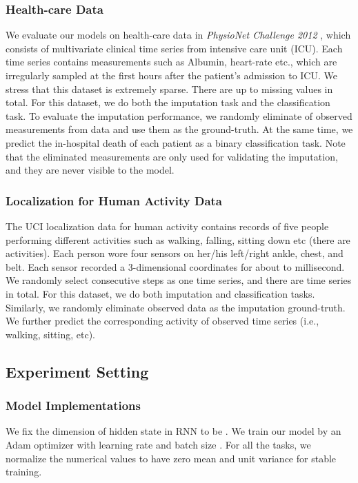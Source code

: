 \documentclass{article}
\begin{document}
\subsubsection{Health-care Data}
We evaluate our models on health-care data in {\em PhysioNet Challenge 2012} \cite{silva2012predicting}, which consists of  multivariate clinical time series from intensive care unit (ICU). Each time series contains  measurements such as Albumin, heart-rate etc., which are irregularly sampled at the first  hours after the patient's admission to ICU. We stress that this dataset is extremely sparse. There are up to  missing values in total.
For this dataset, we do both the imputation task and  the classification task. To evaluate the imputation performance, we randomly eliminate  of observed measurements from data and use them as the  ground-truth. At the same time, we predict the in-hospital death of each patient as a binary classification task. Note that the eliminated measurements are only used for validating the imputation, and they are never visible to the model.

\subsubsection{Localization for Human Activity Data}
The UCI localization data for human activity \cite{kaluvza2010agent} contains records of five people performing different activities such as  walking, falling, sitting down etc (there are  activities). Each person wore four sensors on her/his left/right ankle, chest, and belt. Each sensor recorded a 3-dimensional coordinates for about  to   millisecond. We randomly select  consecutive steps as one time series, and there are  time series in total. For this dataset, we do both imputation and classification tasks. Similarly, we randomly eliminate  observed data as the imputation ground-truth. We further predict the corresponding activity of observed time series (i.e., walking, sitting, etc).

\subsection{Experiment Setting}
\label{exp_setting}

\subsubsection{Model Implementations}
We fix the dimension of hidden state  in RNN to be . We train our model by an Adam optimizer with learning rate  and batch size . For all the tasks, we normalize the numerical values to have zero mean and unit variance for stable training. 
\end{document}
